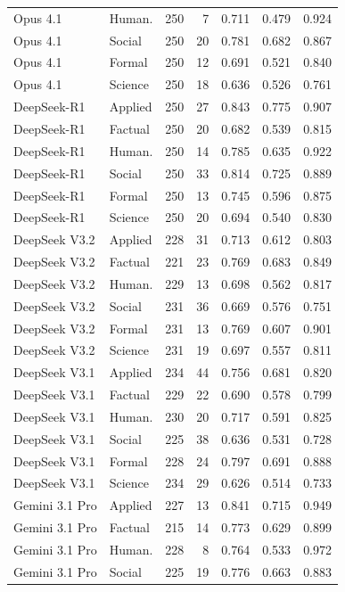 \begin{longtable}{llrrrrr}
Opus 4.1 & Human. & 250 & 7 & 0.711 & 0.479 & 0.924 \\
Opus 4.1 & Social & 250 & 20 & 0.781 & 0.682 & 0.867 \\
Opus 4.1 & Formal & 250 & 12 & 0.691 & 0.521 & 0.840 \\
Opus 4.1 & Science & 250 & 18 & 0.636 & 0.526 & 0.761 \\
DeepSeek-R1 & Applied & 250 & 27 & 0.843 & 0.775 & 0.907 \\
DeepSeek-R1 & Factual & 250 & 20 & 0.682 & 0.539 & 0.815 \\
DeepSeek-R1 & Human. & 250 & 14 & 0.785 & 0.635 & 0.922 \\
DeepSeek-R1 & Social & 250 & 33 & 0.814 & 0.725 & 0.889 \\
DeepSeek-R1 & Formal & 250 & 13 & 0.745 & 0.596 & 0.875 \\
DeepSeek-R1 & Science & 250 & 20 & 0.694 & 0.540 & 0.830 \\
DeepSeek V3.2 & Applied & 228 & 31 & 0.713 & 0.612 & 0.803 \\
DeepSeek V3.2 & Factual & 221 & 23 & 0.769 & 0.683 & 0.849 \\
DeepSeek V3.2 & Human. & 229 & 13 & 0.698 & 0.562 & 0.817 \\
DeepSeek V3.2 & Social & 231 & 36 & 0.669 & 0.576 & 0.751 \\
DeepSeek V3.2 & Formal & 231 & 13 & 0.769 & 0.607 & 0.901 \\
DeepSeek V3.2 & Science & 231 & 19 & 0.697 & 0.557 & 0.811 \\
DeepSeek V3.1 & Applied & 234 & 44 & 0.756 & 0.681 & 0.820 \\
DeepSeek V3.1 & Factual & 229 & 22 & 0.690 & 0.578 & 0.799 \\
DeepSeek V3.1 & Human. & 230 & 20 & 0.717 & 0.591 & 0.825 \\
DeepSeek V3.1 & Social & 225 & 38 & 0.636 & 0.531 & 0.728 \\
DeepSeek V3.1 & Formal & 228 & 24 & 0.797 & 0.691 & 0.888 \\
DeepSeek V3.1 & Science & 234 & 29 & 0.626 & 0.514 & 0.733 \\
Gemini 3.1 Pro & Applied & 227 & 13 & 0.841 & 0.715 & 0.949 \\
Gemini 3.1 Pro & Factual & 215 & 14 & 0.773 & 0.629 & 0.899 \\
Gemini 3.1 Pro & Human. & 228 & 8 & 0.764 & 0.533 & 0.972 \\
Gemini 3.1 Pro & Social & 225 & 19 & 0.776 & 0.663 & 0.883 \\

\end{longtable}
